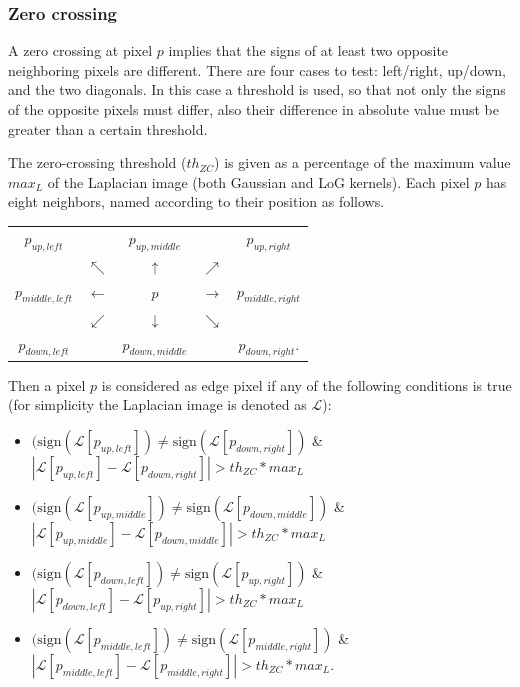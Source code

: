 \documentclass{ipol}
\numberwithin{equation}{section}
\numberwithin{table}{section}
\begin{document}


\subsubsection{Zero crossing}


A zero crossing at pixel $p$ implies that the signs of at least two opposite neighboring pixels are 
different. There are four cases to test: left/right, up/down, and the two diagonals. In this case 
a threshold is used, so that not only the signs of the opposite pixels must differ, also their 
difference in absolute value must be greater than a certain threshold. 

The zero-crossing threshold ($th_{ZC}$) is given as a percentage of the maximum value $max_L$ of the Laplacian 
image (both Gaussian and LoG kernels). Each pixel $p$ has eight neighbors, named according to their position 
as follows.

\begin{center}
\begin{tabular}{ c c c c c }
	$p_{up,left}$		& 					& $p_{up,middle}$	&					& $p_{up,right}$ 		\\
						& $\nwarrow$		& $\uparrow$		& $\nearrow$		&						\\
	$p_{middle,left}$	& $\leftarrow$		& $p$				& $\rightarrow$		& $p_{middle,right}$	\\
						& $\swarrow$		& $\downarrow$		& $\searrow$		&						\\
	$p_{down,left}$		&					& $p_{down,middle}$	&					& $p_{down,right}$.		\\  
\end{tabular}
\end{center}

Then a pixel $p$ is considered as edge pixel if any of the following conditions is true 
(for simplicity the Laplacian image is denoted as $\mathcal{L}$):
\begin{itemize}
	\item $(\mbox{sign}(\mathcal{L}[p_{up,left}])\neq\mbox{sign}(\mathcal{L}[p_{down,right}])$ \& $|\mathcal{L}[p_{up,left}]-\mathcal{L}[p_{down,right}]|>th_{ZC}*max_L$
	\item $(\mbox{sign}(\mathcal{L}[p_{up,middle}])\neq\mbox{sign}(\mathcal{L}[p_{down,middle}])$ \& $|\mathcal{L}[p_{up,middle}]-\mathcal{L}[p_{down,middle}]|>th_{ZC}*max_L$
	\item $(\mbox{sign}(\mathcal{L}[p_{down,left}])\neq\mbox{sign}(\mathcal{L}[p_{up,right}])$ \& $|\mathcal{L}[p_{down,left}]-\mathcal{L}[p_{up,right}]|>th_{ZC}*max_L$
	\item $(\mbox{sign}(\mathcal{L}[p_{middle,left}])\neq\mbox{sign}(\mathcal{L}[p_{middle,right}])$ \& $|\mathcal{L}[p_{middle,left}]-\mathcal{L}[p_{middle,right}]|>th_{ZC}*max_L$. \\
\end{itemize}
\end{document}

